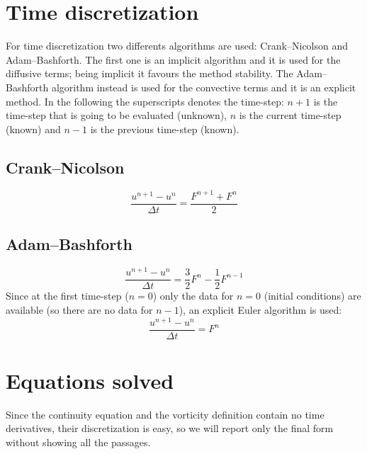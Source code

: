 \section{Time discretization}
For time discretization two differents algorithms are used: Crank--Nicolson and Adam--Bashforth. The first one is an implicit algorithm and it is used for the diffusive terms; being implicit it favours the method stability. The Adam--Bashforth algorithm instead is used for the convective terms and it is an explicit method. In the following the superscripts denotes the time-step: $n+1$ is the time-step that is going to be evaluated (unknown), $n$ is the current time-step (known) and $n-1$ is the previous time-step (known).

\subsection{Crank--Nicolson}
\[
\frac{u^{n+1}-u^n}{\Delta t}=\frac{F^{n+1}+F^n}{2}
\]

\subsection{Adam--Bashforth}
\[
\frac{u^{n+1}-u^n}{\Delta t}=\frac 3 2 F^n-\frac 1 2 F^{n-1}
\]
Since at the first time-step ($n=0$) only the data for $n=0$ (initial conditions) are available (so there are no data for $n-1$), an explicit Euler algorithm is used:
\[
\frac{u^{n+1}-u^n}{\Delta t}=F^n
\]


\section{Equations solved}
Since the continuity equation and the vorticity definition contain no time derivatives, their discretization is easy, so we will report only the final form without showing all the passages.

